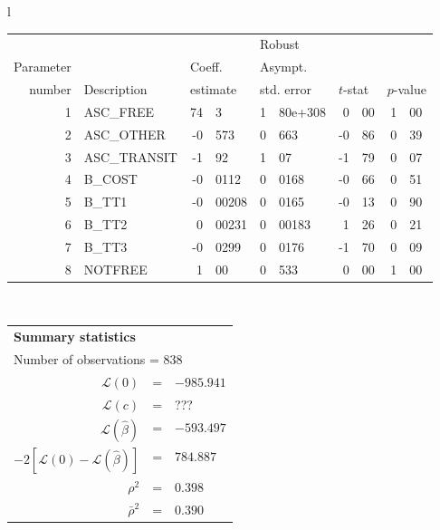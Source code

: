   \begin{tabular}{l}
\begin{tabular}{rlr@{.}lr@{.}lr@{.}lr@{.}l}
         &                       &   \multicolumn{2}{l}{}    & \multicolumn{2}{l}{Robust}  &     \multicolumn{4}{l}{}   \\
Parameter &                       &   \multicolumn{2}{l}{Coeff.}      & \multicolumn{2}{l}{Asympt.}  &     \multicolumn{4}{l}{}   \\
number &  Description                     &   \multicolumn{2}{l}{estimate}      & \multicolumn{2}{l}{std. error}  &   \multicolumn{2}{l}{$t$-stat}  &   \multicolumn{2}{l}{$p$-value}   \\

\hline

1 & ASC\_FREE & 74&3 & 1&80e+308 & 0&00 & 1&00 \\
2 & ASC\_OTHER & -0&573 & 0&663 & -0&86 & 0&39 \\
3 & ASC\_TRANSIT & -1&92 & 1&07 & -1&79 & 0&07 \\
4 & B\_COST & -0&0112 & 0&0168 & -0&66 & 0&51 \\
5 & B\_TT1 & -0&00208 & 0&0165 & -0&13 & 0&90 \\
6 & B\_TT2 & 0&00231 & 0&00183 & 1&26 & 0&21 \\
7 & B\_TT3 & -0&0299 & 0&0176 & -1&70 & 0&09 \\
\hline
8 & NOTFREE & 1&00 & 0&533 & 0&00\footnotemark[1] & 1&00 \\
\hline

\end{tabular}
\\
\begin{tabular}{rcl}
\multicolumn{3}{l}{\bf Summary statistics}\\
\multicolumn{3}{l}{ Number of observations = $838$} \\
 $\mathcal{L}(0)$ &=&  $-985.941$ \\
 $\mathcal{L}(c)$ &=& ???\\
 $\mathcal{L}(\hat{\beta})$ &=& $-593.497 $  \\
 $-2[\mathcal{L}(0) -\mathcal{L}(\hat{\beta})]$ &=& $784.887$ \\
    $\rho^2$ &=&   $0.398$ \\
    $\bar{\rho}^2$ &=&    $0.390$ \\
\end{tabular}
\end{tabular}

